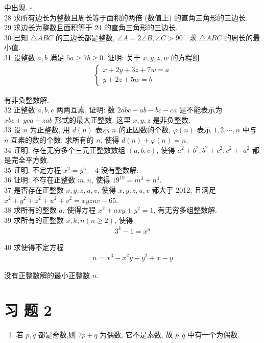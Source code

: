 	中出现. $\square$\\
	28 求所有边长为整数且周长等于面积的两倍 (数值上) 的直角三角形的三边长.\\
	29 求边长为整数且面积等于 24 的直角三角形的三边长.\\
	30 已知 $\triangle A B C$ 的三边长都是整数, $\angle A=2 \angle B, \angle C>90^{\circ}$. 求 $\triangle A B C$ 的周长的最小值.\\
	31 设整数 $a ,  b$ 满足 $5 a \geqslant 7 b \geqslant 0$. 证明: 关于 $x ,  y ,  z, w$ 的方程组
\begin{align*}
		\left\{\begin{array}{l}
			       x+2 y+3 z+7 w=a \\
			       y+2 z+5 w=b
		       \end{array}\right.
	\end{align*}

	有非负整数解.\\
	32 正整数 $a ,  b ,  c$ 两两互素. 证明: 数 $2 a b c-a b-b c-c a$ 是不能表示为 $x b c+y c a+z a b$ 形式的最大正整数, 这里 $x ,  y ,  z$ 是非负整数.\\
	33 设 $n$ 为正整数, 用 $d(n)$ 表示 $n$ 的正因数的个数, $\varphi(n)$ 表示 $1,2, \cdots, n$ 中与 $n$ 互素的数的个数. 求所有的 $n$, 使得 $d(n)+\varphi(n)=n$.\\
	34 证明: 存在无穷多个三元正整数数组 $(a, b, c)$, 使得 $a^{2}+b^{2}, b^{2}+c^{2}, c^{2}+$ $a^{2}$ 都是完全平方数.\\
	35 证明: 不定方程 $x^{2}=y^{5}-4$ 没有整数解. \\
	36 证明: 不存在正整数 $m ,  n$, 使得 $19^{19}=m^{3}+n^{4}$.\\
	37 是否存在正整数 $x ,  y ,  z ,  u ,  v$, 使得 $x ,  y ,  z ,  u ,  v$ 都大于 2012, 且满足 $x^{2}+y^{2}+z^{2}+u^{2}+v^{2}=x y z u v-65$.\\
	38 求所有的整数 $a$, 使得方程 $x^{2}+a x y+y^{2}=1$, 有无穷多组整数解.\\
	39 求所有的正整数 $x ,  k ,  n(n \geqslant 2)$, 使得
\begin{align*}
		3^{k}-1=x^{n}
	\end{align*}

	40 求使得不定方程
\begin{align*}
		n=x^{3}-x^{2} y+y^{2}+x-y
	\end{align*}

	没有正整数解的最小正整数 $n$.

	

\section{习 题 2}
\begin{enumerate}
	\item 若 $p ,  q$ 都是奇数,则 $7 p+q$ 为偶数, 它不是素数, 故 $p ,  q$ 中有一个为偶数.
\end{enumerate}


